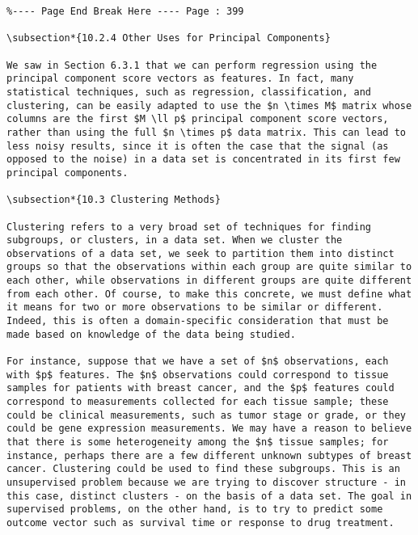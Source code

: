 \documentclass[10pt]{article}
\begin{document}
\begin{verbatim}
%---- Page End Break Here ---- Page : 399

\subsection*{10.2.4 Other Uses for Principal Components}

We saw in Section 6.3.1 that we can perform regression using the principal component score vectors as features. In fact, many statistical techniques, such as regression, classification, and clustering, can be easily adapted to use the $n \times M$ matrix whose columns are the first $M \ll p$ principal component score vectors, rather than using the full $n \times p$ data matrix. This can lead to less noisy results, since it is often the case that the signal (as opposed to the noise) in a data set is concentrated in its first few principal components.

\subsection*{10.3 Clustering Methods}

Clustering refers to a very broad set of techniques for finding subgroups, or clusters, in a data set. When we cluster the observations of a data set, we seek to partition them into distinct groups so that the observations within each group are quite similar to each other, while observations in different groups are quite different from each other. Of course, to make this concrete, we must define what it means for two or more observations to be similar or different. Indeed, this is often a domain-specific consideration that must be made based on knowledge of the data being studied.

For instance, suppose that we have a set of $n$ observations, each with $p$ features. The $n$ observations could correspond to tissue samples for patients with breast cancer, and the $p$ features could correspond to measurements collected for each tissue sample; these could be clinical measurements, such as tumor stage or grade, or they could be gene expression measurements. We may have a reason to believe that there is some heterogeneity among the $n$ tissue samples; for instance, perhaps there are a few different unknown subtypes of breast cancer. Clustering could be used to find these subgroups. This is an unsupervised problem because we are trying to discover structure - in this case, distinct clusters - on the basis of a data set. The goal in supervised problems, on the other hand, is to try to predict some outcome vector such as survival time or response to drug treatment.


\end{verbatim}
\end{document}
